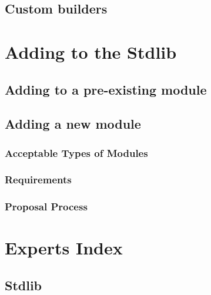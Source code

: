 \documentclass[]{book}
\begin{document}
\hypertarget{custom-builders}{%
\section{Custom builders}\label{custom-builders}}

\hypertarget{adding-to-the-stdlib}{%
\chapter{Adding to the Stdlib}\label{adding-to-the-stdlib}}

\hypertarget{adding-to-a-pre-existing-module}{%
\section{Adding to a pre-existing module}\label{adding-to-a-pre-existing-module}}

\hypertarget{adding-a-new-module}{%
\section{Adding a new module}\label{adding-a-new-module}}

\hypertarget{acceptable-types-of-modules}{%
\subsection{Acceptable Types of Modules}\label{acceptable-types-of-modules}}

\hypertarget{requirements}{%
\subsection{Requirements}\label{requirements}}

\hypertarget{proposal-process}{%
\subsection{Proposal Process}\label{proposal-process}}

\hypertarget{experts-index}{%
\chapter{Experts Index}\label{experts-index}}

\hypertarget{stdlib}{%
\section{Stdlib}\label{stdlib}}
\end{document}
